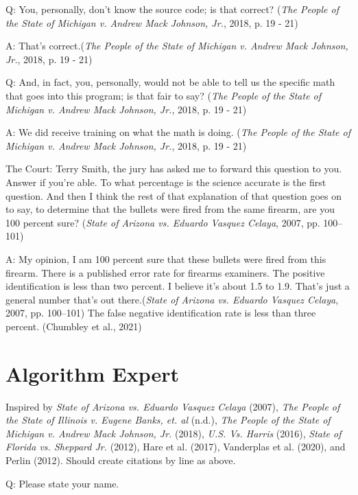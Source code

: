 \documentclass[print]{nuthesis}
\begin{document}
Q: You, personally, don't know the source code; is that correct? (\emph{The {People} of the {State} of {Michigan} v. Andrew {Mack} {Johnson}, {Jr.}}, 2018, p. 19 - 21)

A: That's correct.(\emph{The {People} of the {State} of {Michigan} v. Andrew {Mack} {Johnson}, {Jr.}}, 2018, p. 19 - 21)

Q: And, in fact, you, personally, would not be able to tell us the specific math that goes into this program; is that fair to say? (\emph{The {People} of the {State} of {Michigan} v. Andrew {Mack} {Johnson}, {Jr.}}, 2018, p. 19 - 21)

A: We did receive training on what the math is doing. (\emph{The {People} of the {State} of {Michigan} v. Andrew {Mack} {Johnson}, {Jr.}}, 2018, p. 19 - 21)

The Court: Terry Smith, the jury has asked me to forward this question to you. Answer if you're able.
To what percentage is the science accurate is the first question. And then I think the rest of that explanation of that question goes on to say, to determine that the bullets were fired from the same firearm, are you 100 percent sure? (\emph{State of {Arizona} vs. Eduardo {Vasquez} {Celaya}}, 2007, pp. 100--101)

A: My opinion, I am 100 percent sure that these bullets were fired from this firearm.
There is a published error rate for firearms examiners.
The positive identification is less than two percent.
I believe it's about 1.5 to 1.9. That's just a general number that's out there.(\emph{State of {Arizona} vs. Eduardo {Vasquez} {Celaya}}, 2007, pp. 100--101)
The false negative identification rate is less than three percent. (Chumbley et al., 2021)

\hypertarget{algorithm-expert}{%
\section{Algorithm Expert}\label{algorithm-expert}}

Inspired by \emph{State of {Arizona} vs. Eduardo {Vasquez} {Celaya}} (2007), \emph{The {People} of the {State} of {Illinois} v. Eugene {Banks}, et. al} (n.d.), \emph{The {People} of the {State} of {Michigan} v. Andrew {Mack} {Johnson}, {Jr.}} (2018), \emph{{U.S.} Vs. {Harris}} (2016), \emph{State of {Florida} vs. Sheppard {Jr.}} (2012), Hare et al. (2017), Vanderplas et al. (2020), and Perlin (2012). Should create citations by line as above.

Q: Please state your name.
\end{document}
